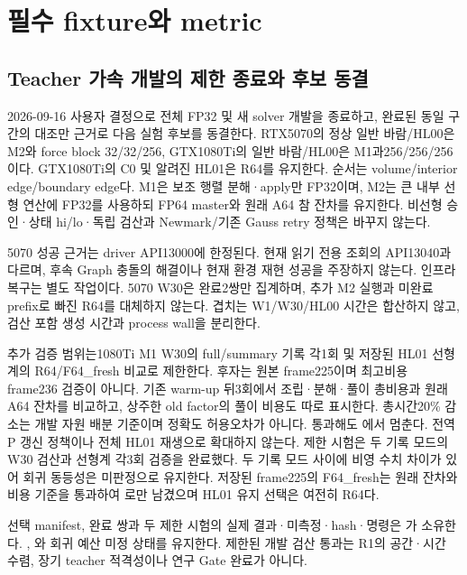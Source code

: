 \documentclass[10pt]{article}
\begin{document}
\section{필수 fixture와 metric}
\label{sec:r1-chapter-7}
\label{sec:r1-fixtures}

\subsection{Teacher 가속 개발의 제한 종료와 후보 동결}
\label{sec:r1-bounded-closeout}
2026-09-16 사용자 결정으로 전체 FP32 및 새 solver 개발을 종료하고, 완료된 동일 구간의
대조만 근거로 다음 실험 후보를 동결한다. RTX5070의 정상 일반 바람/HL00은
M2와 force block 32/32/256, GTX1080Ti의 일반 바람/HL00은 M1과256/256/256이다.
GTX1080Ti의 C0 및 알려진 HL01은 R64를 유지한다. 순서는 volume/interior edge/boundary edge다.
M1은 보조 행렬 분해·apply만 FP32이며, M2는 큰 내부 선형 연산에 FP32를 사용하되
FP64 master와 원래 A64 참 잔차를 유지한다. 비선형 승인·상태 hi/lo·독립 검산과
Newmark/기존 Gauss retry 정책은 바꾸지 않는다.

5070 성공 근거는 driver API13000에 한정된다. 현재 읽기 전용 조회의 API13040과 다르며,
후속 Graph 충돌의 해결이나 현재 환경 재현 성공을 주장하지 않는다. 인프라 복구는 별도 작업이다.
5070 W30은 완료2쌍만 집계하며, 추가 M2 실행과 미완료 prefix로 빠진 R64를 대체하지 않는다.
겹치는 W1/W30/HL00 시간은 합산하지 않고, 검산 포함 생성 시간과 process wall을 분리한다.

추가 검증 범위는1080Ti M1 W30의 full/summary 기록 각1회 및 저장된 HL01 선형계의
R64/F64\_fresh 비교로 제한한다. 후자는 원본 frame225이며 최고비용 frame236 검증이 아니다.
기존 warm-up 뒤3회에서 조립·분해·풀이 총비용과 원래 A64 잔차를 비교하고,
상주한 old factor의 풀이 비용도 따로 표시한다. 총시간20\% 감소는 개발 자원 배분 기준이며
정확도 허용오차가 아니다. 통과해도 에서 멈춘다.
전역 P 갱신 정책이나 전체 HL01 재생으로 확대하지 않는다.
제한 시험은 두 기록 모드의 W30 검산과 선형계 각3회 검증을 완료했다.
두 기록 모드 사이에 비영 수치 차이가 있어 회귀 동등성은 미판정으로 유지한다.
저장된 frame225의 F64\_fresh는 원래 잔차와 비용 기준을 통과하여
로만 남겼으며 HL01 유지 선택은 여전히 R64다.

선택 manifest, 완료 쌍과 두 제한 시험의 실제 결과·미측정·hash·명령은
가 소유한다.
, 와 회귀 예산 미정 상태를 유지한다.
제한된 개발 검산 통과는 R1의 공간·시간 수렴, 장기 teacher 적격성이나 연구 Gate 완료가 아니다.
\end{document}
